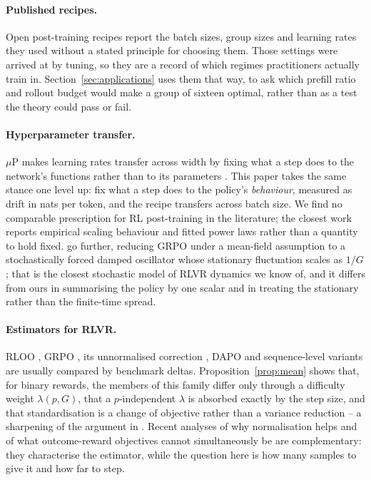 \paragraph{Published recipes.} Open post-training recipes report the batch sizes, group sizes and
learning rates they used \citep{lambert2024tulu, deepseekr1} without a stated principle for
choosing them. Those settings were arrived at by tuning, so they are a record of which regimes
practitioners actually train in. Section~\ref{sec:applications} uses them that way, to ask which
prefill ratio and rollout budget would make a group of sixteen optimal, rather than as a test the
theory could pass or fail.

\paragraph{Hyperparameter transfer.} $\mu$P makes learning rates transfer across width by fixing what
a step does to the network's functions rather than to its parameters
\citep{yang2021tensor, yang2022mutransfer}. This paper takes the same stance one level up: fix what
a step does to the policy's \emph{behaviour}, measured as drift in nats per token, and the recipe
transfers across batch size. We find no comparable prescription for RL post-training in the
literature; the closest work reports empirical scaling behaviour and fitted power laws
\citep{tan2025scalingbehaviors, khatri2025artofscaling} rather than a quantity to hold fixed.
\citet{ghosh2026predictable} go further, reducing GRPO under a mean-field assumption to a
stochastically forced damped oscillator whose stationary fluctuation scales as $1/G$; that is the
closest stochastic model of RLVR dynamics we know of, and it differs from ours in summarising the
policy by one scalar and in treating the stationary rather than the finite-time spread.

\paragraph{Estimators for RLVR.} RLOO \citep{ahmadian2024rloo, williams1992reinforce}, GRPO
\citep{shao2024deepseekmath}, its unnormalised correction \citep{liu2025drgrpo}, DAPO
\citep{yu2025dapo} and sequence-level variants \citep{zheng2025gspo} are usually compared by
benchmark deltas. Proposition~\ref{prop:mean} shows that, for binary rewards, the members of this
family differ only through a difficulty weight $\lambda(p, G)$, that a $p$-independent $\lambda$ is
absorbed exactly by the step size, and that standardisation is a change of objective rather than a
variance reduction -- a sharpening of the argument in \citet{liu2025drgrpo}. Recent analyses of why
normalisation helps \citep{ge2026normalization} and of what outcome-reward objectives cannot
simultaneously be \citep{ding2026impossibility} are complementary: they characterise the estimator,
while the question here is how many samples to give it and how far to step.

